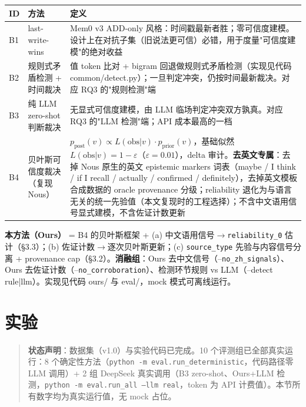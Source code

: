 \documentclass{article}
\begin{document}
\begin{table}[t]
\centering
{\small
\begin{tabularx}{\linewidth}{llX}
\toprule
ID & 方法 & 定义 \\
\midrule
B1 & last-write-wins & Mem0 v3 ADD-only 风格：时间戳最新者胜；零可信度建模。设计上在对抗子集（旧说法更可信）必错，用于度量"可信度建模"的绝对收益 \\
B2 & 规则式矛盾检测 + 时间裁决 & 值 token 比对 + bigram 回退做规则式矛盾检测（实现见代码 common/detect.py）；一旦判定冲突，仍按时间最新裁决。对应 RQ3 的"规则检测"端 \\
B3 & 纯 LLM zero-shot 判断裁决 & 无显式可信度建模，由 LLM 临场判定冲突双方孰真。对应 RQ3 的"LLM 检测"端；API 成本最高的一档 \\
B4 & 贝叶斯可信度裁决（复现 Nous） & $p_{\mathrm{post}}(v) \propto L(\mathrm{obs}|v)\cdot p_{\mathrm{prior}}(v)$，基础似然 $L(\mathrm{obs}|v)=1-\varepsilon$（$\varepsilon=0.01$），delta 审计。\textbf{去英文专属}：去掉 Nous 原生的英文 epistemic markers 词表（maybe / I think / if I recall / actually / confirmed / definitely），去掉英文模板合成数据的 oracle provenance 分级；reliability 退化为与语言无关的统一先验值（本文复现时的工程选择）；不含中文语用信号显式建模，不含佐证计数更新 \\
\bottomrule
\end{tabularx}
}
\label{tab:baselines}
\end{table}

\textbf{本方法（Ours）} = B4 的贝叶斯框架 + (a) 中文语用信号$\to$\texttt{reliability\_0} 估计（§3.3）；(b) 佐证计数$\to$逐次贝叶斯更新；(c) \texttt{source\_type} 先验与内容信号分离 + provenance cap（§3.2）。\textbf{消融组}：Ours 去中文信号（--\texttt{no\_zh\_signals}）、Ours 去佐证计数（--\texttt{no\_corroboration}）、检测环节规则 vs LLM（--detect rule|llm）。实现见代码 ours/ 与 eval/，mock 模式可离线运行。


\section{实验}

\begin{quote}
\textbf{状态声明}：数据集（v1.0）与实验代码已完成。10 个评测组已全部真实运行：8 个确定性方法（\texttt{python -m eval.run\_deterministic}，代码路径零 LLM 调用）+ 2 组 DeepSeek 真实调用（B3 zero-shot、Ours+LLM 检测，\texttt{python -m eval.run\_all --llm real}，token 为 API 计费值）。本节所有数字均为真实运行值，无 mock 占位。

\end{quote}
\end{document}
